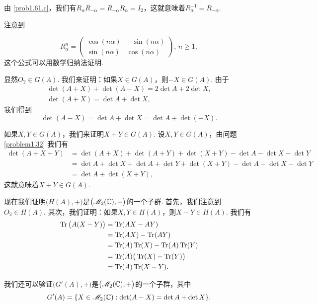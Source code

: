 \begin{solution}
      \begin{enuma}
        \setcounter{enumi}{3}
        \item 由 \ref{prob1.61.c}，我们有$R_\alpha R_{-\alpha}=R_{-\alpha}R_\alpha=I_2$，这就意味着$R_\alpha^{-1}=R_{-\alpha}$.
        \item 注意到
      \end{enuma}
      \[
         R_\alpha ^n = \begin{pmatrix}
           \cos(n\alpha) & -\sin(n\alpha) \\
           \sin(n\alpha) & \cos (n\alpha)
         \end{pmatrix},\,n\ge1,
      \]
      这个公式可以用数学归纳法证明.
\end{solution}

\begin{solution}
  显然$O_2\in G(A)$. 我们来证明：如果$X\in G(A)$，则$-X\in G(A)$. 由于
  \begin{gather*}
    \det (A + X) + \det (A - X) = 2\det A + 2\det X,\\
    \det (A + X) = \det A + \det X,
  \end{gather*}
  我们得到
  \[
    \det (A - X) = \det A + \det X = \det A + \det (-X).
  \]

  如果$X,Y\in G(A)$，我们来证明$X+Y\in G(A)$. 设$X,Y\in G(A)$，由问题 \ref{problem1.32} 我们有
  \begin{align*}
    \det (A+X+Y) & = \det (A+X) + \det(A+Y) + \det (X+Y) - \det A - \det X - \det Y \\
    & = \det A + \det X + \det A + \det Y + \det (X+Y) -\det A - \det X - \det Y \\
    & = \det A + \det (X+Y),
  \end{align*}
  这就意味着$X+Y\in G(A)$.

  现在我们证明$\big( H(A),+\big)$是$\big(
  \mathscr M_2(\mathbb C),+\big)$的一个子群. 首先，我们注意到$O_2\in H(A)$. 其次，我们证明：如果$X,Y\in H(A)$，则$X-Y\in H(A)$. 我们有
  \begin{align*}
    \operatorname{Tr} \big(  A(X-Y)\big) & = \operatorname{Tr}(AX - AY)\\
    & = \operatorname{Tr}(AX) - \operatorname{Tr}(AY) \\
    & = \operatorname{Tr}(A)\operatorname{Tr}(X) - \operatorname{Tr}(A)\operatorname{Tr}(Y) \\
    & = \operatorname{Tr}(A) \big( \operatorname{Tr}(X) - \operatorname{Tr}(Y) \big) \\
    & = \operatorname{Tr}(A) \operatorname{Tr}(X - Y).
  \end{align*}
\end{solution}

\begin{remark}
  我们还可以验证$\big(G'(A),+\big)$是$\big(
  \mathscr M_2(\mathbb C),+\big)$的一个子群，其中
  \[
    G'(A) = \{ X\in\mathscr M_2(\mathbb C): \det(A-X)
    =\det A + \det X \}.
  \]
\end{remark}

